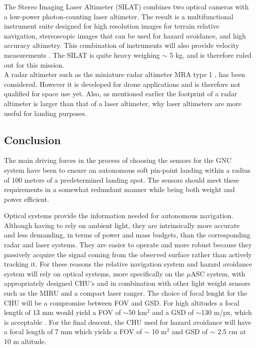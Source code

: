 The Stereo Imaging Laser Altimeter (SILAT) combines two optical cameras with a low-power photon-counting laser altimeter. The result is a multifunctional instrument suite designed for high resolution images for terrain relative navigation, stereoscopic images that can be used for hazard avoidance, and high accuracy altimetry. This combination of instruments will also provide velocity measurements \cite{SILAT}. The SILAT is quite heavy weighing $\sim$ 5 kg, and is therefore ruled out for this mission.\\

A radar altimeter such as the miniature radar altimeter MRA type 1 \cite{MRA1}, has been considered. However it is developed for drone applications and is therefore not qualified for space use yet. Also, as mentioned earlier the footprint of a radar altimeter is larger than that of a laser altimeter, why laser altimeters are more useful for landing purposes.  


\subsection{Conclusion}

The main driving forces in the process of choosing the sensors for the GNC system have been to ensure an autonomous soft pin-point landing within a radius of 100 meters of a predetermined landing spot. The sensors should meet these requirements in a somewhat redundant manner while being both weight and power efficient. 

Optical systems provide the information needed for autonomous navigation. Although having to rely on ambient light, they are intrinsically more accurate and less demanding, in terms of power and mass budgets, than the corresponding radar and laser systems. They are easier to operate and more robust because they passively acquire the signal coming from the observed surface rather than actively tracking it. For these reasons the relative navigation system and hazard avoidance system will rely on optical systems, more specifically on the $\mu$ASC system, with appropriately designed CHU's and in combination with other light weight sensors such as the MIRU and a compact laser ranger. The choice of focal lenght for the CHU will be a compromise between FOV and GSD. For high altitudes a focal length of 13 mm would yield a FOV of $\sim$50 km$^2$ and a GSD of $\sim$130 m/px, which is acceptable . For the final descent, the CHU used for hazard avoidance will have a focal length of 7 mm which yields a FOV of $\sim$ 10 m$^2$ and GSD of $\sim$ 2.5 cm at 10 m altitude. 

